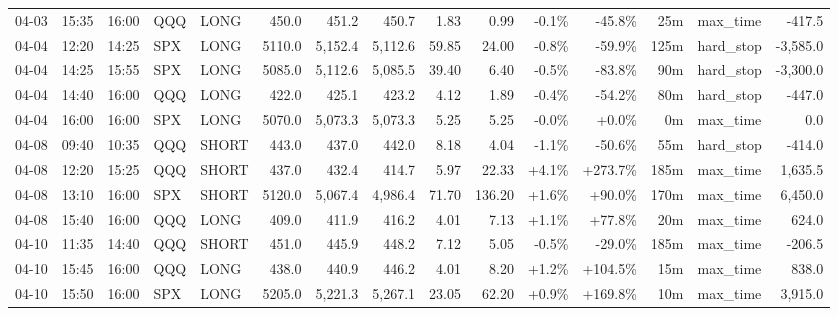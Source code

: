 \documentclass[11pt,a4paper,twoside]{article}
\begin{document}
\begin{landscape}
\begin{center}
\begin{longtable}{>{\color{txtmain}}l l l l l r r r r r r r r >{\color{txtmain}}l r}
04-03 & 15:35 & 16:00 & QQQ & LONG & 450.0 & 451.2 & 450.7 & 1.83 & 0.99 & \textcolor{lossred}{-0.1\%} & \textcolor{lossred}{-45.8\%} & 25m & max\_time & \textcolor{lossred}{-417.5} \\
04-04 & 12:20 & 14:25 & SPX & LONG & 5110.0 & 5,152.4 & 5,112.6 & 59.85 & 24.00 & \textcolor{lossred}{-0.8\%} & \textcolor{lossred}{-59.9\%} & 125m & hard\_stop & \textcolor{lossred}{-3,585.0} \\
04-04 & 14:25 & 15:55 & SPX & LONG & 5085.0 & 5,112.6 & 5,085.5 & 39.40 & 6.40 & \textcolor{lossred}{-0.5\%} & \textcolor{lossred}{-83.8\%} & 90m & hard\_stop & \textcolor{lossred}{-3,300.0} \\
04-04 & 14:40 & 16:00 & QQQ & LONG & 422.0 & 425.1 & 423.2 & 4.12 & 1.89 & \textcolor{lossred}{-0.4\%} & \textcolor{lossred}{-54.2\%} & 80m & hard\_stop & \textcolor{lossred}{-447.0} \\
04-04 & 16:00 & 16:00 & SPX & LONG & 5070.0 & 5,073.3 & 5,073.3 & 5.25 & 5.25 & \textcolor{lossred}{-0.0\%} & \textcolor{wingreen}{+0.0\%} & 0m & max\_time & \textcolor{wingreen}{0.0} \\
04-08 & 09:40 & 10:35 & QQQ & SHORT & 443.0 & 437.0 & 442.0 & 8.18 & 4.04 & \textcolor{lossred}{-1.1\%} & \textcolor{lossred}{-50.6\%} & 55m & hard\_stop & \textcolor{lossred}{-414.0} \\
04-08 & 12:20 & 15:25 & QQQ & SHORT & 437.0 & 432.4 & 414.7 & 5.97 & 22.33 & \textcolor{wingreen}{+4.1\%} & \textcolor{wingreen}{+273.7\%} & 185m & max\_time & \textcolor{wingreen}{1,635.5} \\
04-08 & 13:10 & 16:00 & SPX & SHORT & 5120.0 & 5,067.4 & 4,986.4 & 71.70 & 136.20 & \textcolor{wingreen}{+1.6\%} & \textcolor{wingreen}{+90.0\%} & 170m & max\_time & \textcolor{wingreen}{6,450.0} \\
04-08 & 15:40 & 16:00 & QQQ & LONG & 409.0 & 411.9 & 416.2 & 4.01 & 7.13 & \textcolor{wingreen}{+1.1\%} & \textcolor{wingreen}{+77.8\%} & 20m & max\_time & \textcolor{wingreen}{624.0} \\
04-10 & 11:35 & 14:40 & QQQ & SHORT & 451.0 & 445.9 & 448.2 & 7.12 & 5.05 & \textcolor{lossred}{-0.5\%} & \textcolor{lossred}{-29.0\%} & 185m & max\_time & \textcolor{lossred}{-206.5} \\
04-10 & 15:45 & 16:00 & QQQ & LONG & 438.0 & 440.9 & 446.2 & 4.01 & 8.20 & \textcolor{wingreen}{+1.2\%} & \textcolor{wingreen}{+104.5\%} & 15m & max\_time & \textcolor{wingreen}{838.0} \\
04-10 & 15:50 & 16:00 & SPX & LONG & 5205.0 & 5,221.3 & 5,267.1 & 23.05 & 62.20 & \textcolor{wingreen}{+0.9\%} & \textcolor{wingreen}{+169.8\%} & 10m & max\_time & \textcolor{wingreen}{3,915.0} \\

\end{longtable}
\end{center}
\end{landscape}
\end{document}
